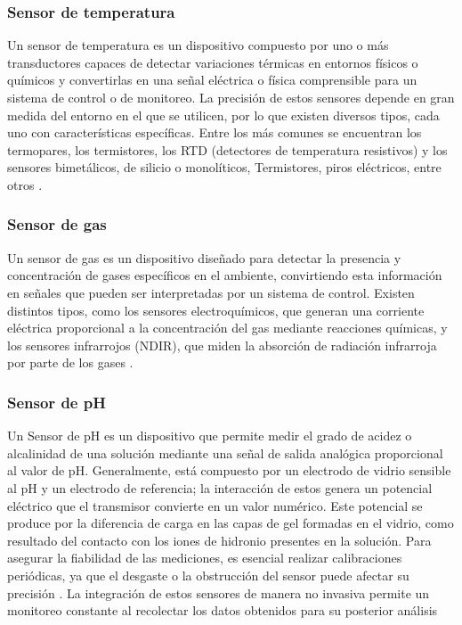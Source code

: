 \subsubsection{Sensor de temperatura}
Un sensor de temperatura es un dispositivo compuesto por uno o más transductores
capaces de detectar variaciones térmicas en entornos físicos o químicos y
convertirlas en una señal eléctrica o física comprensible para un sistema de control
o de monitoreo. La precisión de estos sensores depende en gran medida del entorno
en el que se utilicen, por lo que existen diversos tipos, cada uno con características
específicas. Entre los más comunes se encuentran los termopares, los termistores, los RTD (detectores de temperatura resistivos) y los sensores bimetálicos, de silicio
o monolíticos, Termistores, piros eléctricos, entre otros \cite{Gros}.
\subsubsection{Sensor de gas}
Un sensor de gas es un dispositivo diseñado para detectar la presencia y
concentración de gases específicos en el ambiente, convirtiendo esta información
en señales que pueden ser interpretadas por un sistema de control. Existen distintos
tipos, como los sensores electroquímicos, que generan una corriente eléctrica
proporcional a la concentración del gas mediante reacciones químicas, y los
sensores infrarrojos (NDIR), que miden la absorción de radiación infrarroja por parte
de los gases \cite{AG&Co.KGaA.2009}.

\subsubsection{Sensor de pH}
Un Sensor de pH es un dispositivo que permite medir el grado de acidez o
alcalinidad de una solución mediante una señal de salida analógica proporcional al
valor de pH. Generalmente, está compuesto por un electrodo de vidrio sensible al
pH y un electrodo de referencia; la interacción de estos genera un potencial eléctrico
que el transmisor convierte en un valor numérico. Este potencial se produce por la
diferencia de carga en las capas de gel formadas en el vidrio, como resultado del
contacto con los iones de hidronio presentes en la solución. Para asegurar la
fiabilidad de las mediciones, es esencial realizar calibraciones periódicas, ya que el
desgaste o la obstrucción del sensor puede afectar su precisión \cite{2015}.
La integración de estos sensores de manera no invasiva permite un monitoreo
constante al recolectar los datos obtenidos para su posterior análisis
